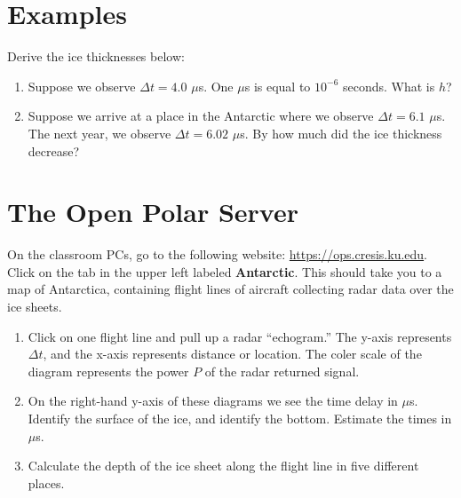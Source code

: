 \documentclass{article}
\begin{document}
\section{Examples}
Derive the ice thicknesses below:
\begin{enumerate}
\item Suppose we observe $\Delta t = 4.0$ $\mu$s.  One $\mu$s is equal to $10^{-6}$ seconds.  What is $h$?
\item Suppose we arrive at a place in the Antarctic where we observe $\Delta t = 6.1$ $\mu$s.  The next year, we observe $\Delta t = 6.02$ $\mu$s. By how much did the ice thickness decrease?
\end{enumerate}

\section{The Open Polar Server}

On the classroom PCs, go to the following website: \url{https://ops.cresis.ku.edu}.  Click on the tab in the upper left labeled \textbf{Antarctic}.  This should take you to a map of Antarctica, containing flight lines of aircraft collecting radar data over the ice sheets.

\begin{enumerate}
\item Click on one flight line and pull up a radar ``echogram.''  The y-axis represents $\Delta t$, and the x-axis represents distance or location.  The coler scale of the diagram represents the power $P$ of the radar returned signal.
\item On the right-hand y-axis of these diagrams we see the time delay in $\mu$s.  Identify the surface of the ice, and identify the bottom.  Estimate the times in $\mu$s.
\item Calculate the depth of the ice sheet along the flight line in five different places.
\end{enumerate}
\end{document}
